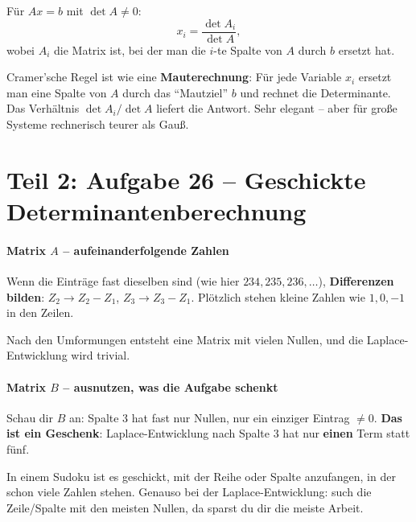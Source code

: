 \documentclass[a4paper,12pt]{article}
\begin{document}
\begin{merkbox}[title={Cramer'sche Regel}]
F\"ur $Ax = b$ mit $\det A \neq 0$:
\[
x_i = \frac{\det A_i}{\det A},
\]
wobei $A_i$ die Matrix ist, bei der man die $i$-te Spalte von $A$ durch $b$ ersetzt hat.
\end{merkbox}

\begin{analogie}
Cramer'sche Regel ist wie eine \textbf{Mauterechnung}: F\"ur jede Variable $x_i$ ersetzt man eine Spalte von $A$ durch das ``Mautziel'' $b$ und rechnet die Determinante. Das Verh\"altnis $\det A_i / \det A$ liefert die Antwort. Sehr elegant -- aber f\"ur gro\ss e Systeme rechnerisch teurer als Gau\ss.
\end{analogie}

\newpage

\part*{Teil 2: Aufgabe 26 -- Geschickte Determinantenberechnung}

\subsection*{Matrix $A$ -- aufeinanderfolgende Zahlen}

\begin{merkbox}[title={Trick}]
Wenn die Eintr\"age fast dieselben sind (wie hier $234, 235, 236, \dots$), \textbf{Differenzen bilden}: $Z_2 \to Z_2 - Z_1$, $Z_3 \to Z_3 - Z_1$. Pl\"otzlich stehen kleine Zahlen wie $1, 0, -1$ in den Zeilen.
\end{merkbox}

Nach den Umformungen entsteht eine Matrix mit vielen Nullen, und die Laplace-Entwicklung wird trivial.

\subsection*{Matrix $B$ -- ausnutzen, was die Aufgabe schenkt}

Schau dir $B$ an: Spalte 3 hat fast nur Nullen, nur ein einziger Eintrag $\neq 0$. \textbf{Das ist ein Geschenk}: Laplace-Entwicklung nach Spalte 3 hat nur \textbf{einen} Term statt f\"unf.

\begin{analogie}
In einem Sudoku ist es geschickt, mit der Reihe oder Spalte anzufangen, in der schon viele Zahlen stehen. Genauso bei der Laplace-Entwicklung: such die Zeile/Spalte mit den meisten Nullen, da sparst du dir die meiste Arbeit.
\end{analogie}
\end{document}
